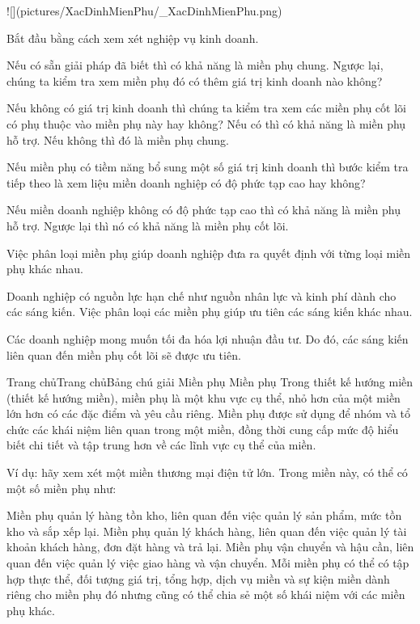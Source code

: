 ![](pictures/XacDinhMienPhu/_XacDinhMienPhu.png)


Bắt đầu bằng cách xem xét nghiệp vụ kinh doanh.

Nếu có sẵn giải pháp đã biết thì có khả năng là miền phụ chung. Ngược lại, chúng ta kiểm tra xem miền phụ đó có thêm giá trị kinh doanh nào không?

Nếu không có giá trị kinh doanh thì chúng ta kiểm tra xem các miền phụ cốt lõi có phụ thuộc vào miền phụ này hay không? Nếu có thì có khả năng là miền phụ hỗ trợ. Nếu không thì đó là miền phụ chung.

Nếu miền phụ có tiềm năng bổ sung một số giá trị kinh doanh thì bước kiểm tra tiếp theo là xem liệu miền doanh nghiệp có độ phức tạp cao hay không?

Nếu miền doanh nghiệp không có độ phức tạp cao thì có khả năng là miền phụ hỗ trợ. Ngược lại thì nó có khả năng là miền phụ cốt lõi.


Việc phân loại miền phụ giúp doanh nghiệp đưa ra quyết định với từng loại miền phụ khác nhau.

Doanh nghiệp có nguồn lực hạn chế như nguồn nhân lực và kinh phí dành cho các sáng kiến. Việc phân loại các miền phụ giúp ưu tiên các sáng kiến khác nhau.

Các doanh nghiệp mong muốn tối đa hóa lợi nhuận đầu tư. Do đó, các sáng kiến liên quan đến miền phụ cốt lõi sẽ được ưu tiên.

%


Trang chủTrang chủBảng chú giải Miền phụ
Miền phụ
Trong thiết kế hướng miền (thiết kế hướng miền), miền phụ là một khu vực cụ thể, nhỏ hơn của một miền lớn hơn có các đặc điểm và yêu cầu riêng. Miền phụ được sử dụng để nhóm và tổ chức các khái niệm liên quan trong một miền, đồng thời cung cấp mức độ hiểu biết chi tiết và tập trung hơn về các lĩnh vực cụ thể của miền.

Ví dụ: hãy xem xét một miền thương mại điện tử lớn. Trong miền này, có thể có một số miền phụ như:

Miền phụ quản lý hàng tồn kho, liên quan đến việc quản lý sản phẩm, mức tồn kho và sắp xếp lại.
Miền phụ quản lý khách hàng, liên quan đến việc quản lý tài khoản khách hàng, đơn đặt hàng và trả lại.
Miền phụ vận chuyển và hậu cần, liên quan đến việc quản lý việc giao hàng và vận chuyển.
Mỗi miền phụ có thể có tập hợp thực thể, đối tượng giá trị, tổng hợp, dịch vụ miền và sự kiện miền dành riêng cho miền phụ đó nhưng cũng có thể chia sẻ một số khái niệm với các miền phụ khác.

